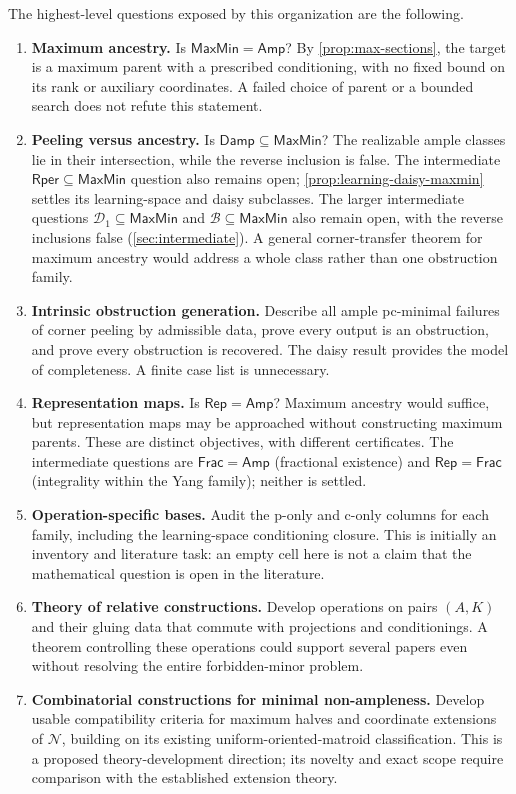 \documentclass[11pt]{article}
\theoremstyle{definition}
\newcommand{\Amp}{\mathsf{Amp}}
\newcommand{\MaxMin}{\mathsf{MaxMin}}
\newcommand{\Damp}{\mathsf{Damp}}
\newcommand{\Rep}{\mathsf{Rep}}
\newcommand{\Frac}{\mathsf{Frac}}
\newcommand{\Rper}{\mathsf{Rper}}
\begin{document}
The highest-level questions exposed by this organization are the following.
\begin{enumerate}[leftmargin=*]
\item \textbf{Maximum ancestry.} Is $\MaxMin=\Amp$? By
\cref{prop:max-sections}, the target is a maximum parent with a prescribed
conditioning, with no fixed bound on its rank or auxiliary coordinates.
A failed choice of parent or a bounded search does not refute this statement.
\item \textbf{Peeling versus ancestry.} Is $\Damp\subseteq\MaxMin$?
The realizable ample classes lie in their intersection, while the reverse
inclusion is false. The intermediate $\Rper\subseteq\MaxMin$ question
also remains open; \cref{prop:learning-daisy-maxmin} settles its learning-space
and daisy subclasses. The larger intermediate questions
$\mathcal D_1\subseteq\MaxMin$ and $\mathcal B\subseteq\MaxMin$
also remain open, with the reverse inclusions false
(\cref{sec:intermediate}). A general corner-transfer theorem for maximum ancestry
would address a whole class rather than one obstruction family.
\item \textbf{Intrinsic obstruction generation.} Describe all ample
pc-minimal failures of corner peeling by admissible data, prove every output
is an obstruction, and prove every obstruction is recovered. The daisy result
provides the model of completeness. A finite case list is unnecessary.
\item \textbf{Representation maps.} Is $\Rep=\Amp$? Maximum ancestry
would suffice, but representation maps may be approached without constructing
maximum parents. These are distinct objectives, with different certificates.
The intermediate questions are $\Frac=\Amp$ (fractional existence) and
$\Rep=\Frac$ (integrality within the Yang family); neither is settled.
\item \textbf{Operation-specific bases.} Audit the p-only and c-only
columns for each family, including the learning-space conditioning closure.
This is initially an inventory and literature task: an empty cell here is
not a claim that the mathematical question is open in the literature.
\item \textbf{Theory of relative constructions.} Develop operations on
pairs $(A,K)$ and their gluing data that commute with projections and
conditionings. A theorem controlling these operations could support several
papers even without resolving the entire forbidden-minor problem.
\item \textbf{Combinatorial constructions for minimal non-ampleness.}
Develop usable compatibility criteria for maximum halves and coordinate
extensions of $\mathcal N$, building on its existing uniform-oriented-matroid
classification. This is a proposed theory-development direction; its novelty
and exact scope require comparison with the established extension theory.
\end{enumerate}
\end{document}
